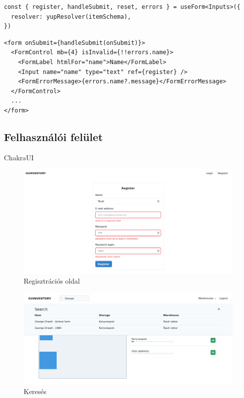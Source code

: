 \begin{lstlisting}[style=ES6, caption={useForm hook}]
const { register, handleSubmit, reset, errors } = useForm<Inputs>({
  resolver: yupResolver(itemSchema),
})
\end{lstlisting}

\begin{lstlisting}[style=ES6, caption={Form}]
<form onSubmit={handleSubmit(onSubmit)}>
  <FormControl mb={4} isInvalid={!!errors.name}>
    <FormLabel htmlFor="name">Name</FormLabel>
    <Input name="name" type="text" ref={register} />
    <FormErrorMessage>{errors.name?.message}</FormErrorMessage>
  </FormControl>
  ...
</form>
\end{lstlisting}


\subsection{Felhasználói felület}
ChakraUI
\begin{figure}[!ht]
  \centering
  \includegraphics[width=150mm, keepaspectratio]{figures/reg.png}
  \caption{Regisztrációs oldal}
  \label{fig:reg}
\end{figure}

\begin{figure}[!ht]
  \centering
  \includegraphics[width=150mm, keepaspectratio]{figures/search.png}
  \caption{Keresés}
  \label{fig:search}
\end{figure}

